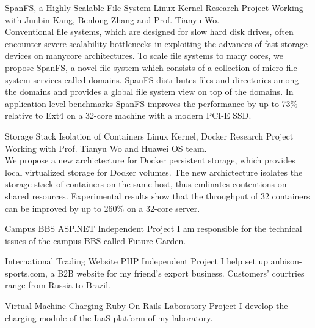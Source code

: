 \documentclass[11pt,a4paper]{moderncv}
\begin{document}
\vspace*{0.2\baselineskip}
{SpanFS, a Highly Scalable File System}
{Linux Kernel}
{Research Project}{}
{Working with Junbin Kang, Benlong Zhang and Prof. Tianyu Wo. \\
Conventional file systems, which are designed for slow hard disk drives, often encounter severe scalability bottlenecks in exploiting the advances of fast storage devices on manycore architectures. To scale file systems to many cores, we propose SpanFS, a novel file system which consists of a collection of micro file system services called domains. SpanFS distributes files and directories among the domains and provides a global file system view on top of the domains. In application-level benchmarks SpanFS improves the performance by up to 73\% relative to Ext4 on a 32-core machine with a modern PCI-E SSD.
}

\vspace*{0.2\baselineskip}
{Storage Stack Isolation of Containers}
{Linux Kernel, Docker}
{Research Project}{}
{Working with Prof. Tianyu Wo and Huawei OS team. \\
We propose a new archictecture for Docker persistent storage, which provides local virtualized storage for Docker volumes. The new archictecture isolates the storage stack of containers on the same host, thus emlinates contentions on shared resources. Experimental results show that the throughput of 32 containers can be improved by up to 260\% on a 32-core server.
}


\vspace*{0.2\baselineskip}
{Campus BBS}
{ASP.NET}
{Independent Project}{}
{I am responsible for the technical issues of the campus BBS called Future Garden.
}

\vspace*{0.2\baselineskip}
{International Trading Website}
{PHP}
{Independent Project}{}
{I help set up anbison-sports.com, a B2B website for my friend's export business. Customers' courtries range from Russia to Brazil.
}

\vspace*{0.2\baselineskip}
{Virtual Machine Charging}
{Ruby On Rails}
{Laboratory Project}{}
{I develop the charging module of the IaaS platform of my laboratory.
}
\end{document}
